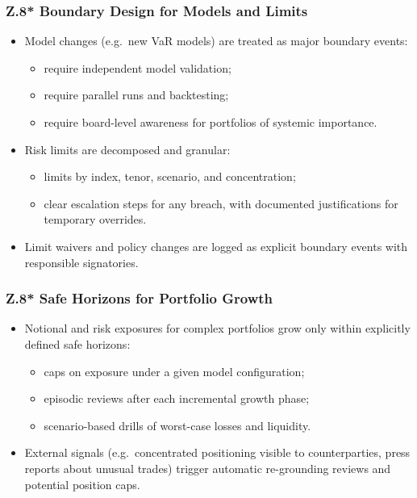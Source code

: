 \subsubsection*{Z.8* Boundary Design for Models and Limits}

\begin{itemize}
  \item Model changes (e.g.\ new VaR models) are treated as major boundary
        events:
        \begin{itemize}
          \item require independent model validation;
          \item require parallel runs and backtesting;
          \item require board-level awareness for portfolios of systemic
                importance.
        \end{itemize}
  \item Risk limits are decomposed and granular:
        \begin{itemize}
          \item limits by index, tenor, scenario, and concentration;
          \item clear escalation steps for any breach, with documented
                justifications for temporary overrides.
        \end{itemize}
  \item Limit waivers and policy changes are logged as explicit boundary
        events with responsible signatories.
\end{itemize}

\subsubsection*{Z.8* Safe Horizons for Portfolio Growth}

\begin{itemize}
  \item Notional and risk exposures for complex portfolios grow only within
        explicitly defined safe horizons:
        \begin{itemize}
          \item caps on exposure under a given model configuration;
          \item episodic reviews after each incremental growth phase;
          \item scenario-based drills of worst-case losses and liquidity.
        \end{itemize}
  \item External signals (e.g.\ concentrated positioning visible to
        counterparties, press reports about unusual trades) trigger automatic
        re-grounding reviews and potential position caps.
\end{itemize}

